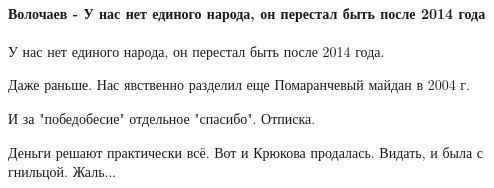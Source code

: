  
 
 
 
 

\paragraph{Волочаев - У нас нет единого народа, он перестал быть после 2014 года}

\begin{itemize}

 
У нас нет единого народа, он перестал быть после 2014 года.

 
Даже раньше. Нас явственно разделил еще Помаранчевый майдан в 2004 г.


 
И за "победобесие" отдельное "спасибо".
Отписка.

 

Деньги решают практически всё. Вот и Крюкова продалась. Видать, и была с
гнильцой. Жаль...

\begin{itemize}
 

\end{itemize}
\end{itemize}

